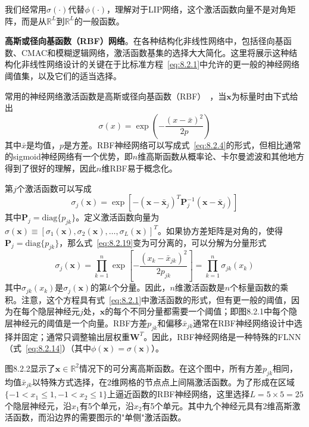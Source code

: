 \documentclass[12pt,a4paper]{ctexart}
\begin{document}
我们经常用$\sigma(\cdot)$代替$\phi(\cdot)$，理解对于LIP网络，这个激活函数向量不是对角矩阵，而是从$\mathbb{R}^L$到$\mathbb{R}^L$的一般函数。

\textbf{高斯或径向基函数（RBF）网络}。在各种结构化非线性网络中，包括径向基函数、CMAC和模糊逻辑网络，激活函数基集的选择大大简化。这里将展示这种结构化非线性网络设计的关键在于比标准方程~\eqref{eq:8.2.1}中允许的更一般的神经网络阈值集，以及它们的适当选择。

常用的神经网络激活函数是高斯或径向基函数（RBF）~\cite{sanner1991}，当$\bm{x}$为标量时由下式给出
\begin{equation}\label{eq:8.2.18}
\sigma(x) = \exp\left(-\frac{(x-\bar{x})^2}{2p}\right)
\end{equation}
其中$\bar{x}$是均值，$p$是方差。RBF神经网络可以写成式~\eqref{eq:8.2.4}的形式，但相比通常的sigmoid神经网络有一个优势，即$n$维高斯函数从概率论、卡尔曼滤波和其他地方得到了很好的理解，因此$n$维RBF易于概念化。

第$j$个激活函数可以写成
\begin{equation}\label{eq:8.2.19}
\sigma_j(\bm{x}) = \exp\left[-(\bm{x}-\bar{\bm{x}}_j)^T \bm{P}_j^{-1}(\bm{x}-\bar{\bm{x}}_j)\right]
\end{equation}
其中$\bm{P}_j = \text{diag}\{p_{jk}\}$。定义激活函数向量为$\sigma(\bm{x}) \equiv [\sigma_1(\bm{x}), \sigma_2(\bm{x}), \ldots, \sigma_L(\bm{x})]^T$。如果协方差矩阵是对角的，使得$\bm{P}_j = \text{diag}\{p_{jk}\}$，那么式~\eqref{eq:8.2.19}变为可分离的，可以分解为分量形式
\begin{equation}\label{eq:8.2.20}
\sigma_j(\bm{x}) = \prod_{k=1}^{n} \exp\left[-\frac{(x_k-\bar{x}_{jk})^2}{2p_{jk}}\right] = \prod_{k=1}^{n} \sigma_{jk}(x_k)
\end{equation}
其中$\sigma_{jk}(x_k)$是$\sigma_j(\bm{x})$的第$k$个分量。因此，$n$维激活函数是$n$个标量函数的乘积。注意，这个方程具有式~\eqref{eq:8.2.1}中激活函数的形式，但有更一般的阈值，因为在每个隐层神经元$j$处，$\bm{x}$的每个不同分量都需要一个阈值；即图8.2.1中每个隐层神经元的阈值是一个向量。RBF方差$p_{jk}$和偏移$\bar{x}_{jk}$通常在RBF神经网络设计中选择并固定；通常只调整输出层权重$\bm{W}^T$。因此，RBF神经网络是一种特殊的FLNN（式~\eqref{eq:8.2.14}）（其中$\phi(\bm{x}) = \sigma(\bm{x})$）。

图8.2.2显示了$\bm{x} \in \mathbb{R}^2$情况下的可分离高斯函数。在这个图中，所有方差$p_{jk}$相同，均值$\bar{x}_{jk}$以特殊方式选择，在2维网格的节点点上间隔激活函数。为了形成在区域$\{-1 < x_1 \leq 1, -1 < x_2 \leq 1\}$上逼近函数的RBF神经网络，这里选择$L = 5 \times 5 = 25$个隐层神经元，沿$x_1$有5个单元，沿$x_2$有5个单元。其中九个神经元具有2维高斯激活函数，而沿边界的需要图示的"单侧"激活函数。
\end{document}
